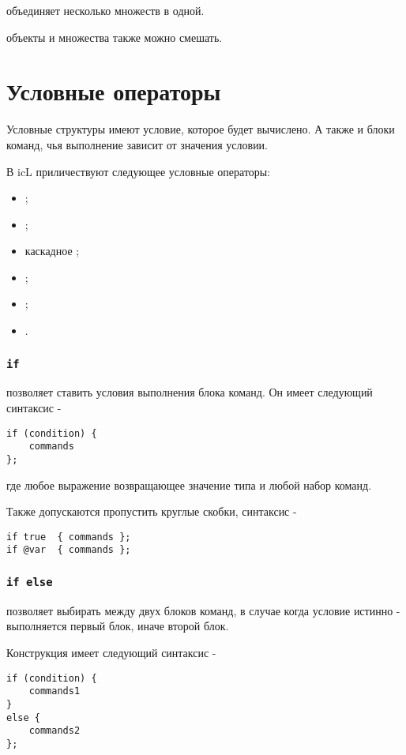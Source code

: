 \documentclass[a4paper, 14pt]{extarticle}
\newenvironment{icItems}
	{ \begin{itemize} [noitemsep,nolistsep] }
	{ \end{itemize} }
\begin{document}
 объединяет несколько множеств в одной.

 объекты и множества также можно смешать.

\newpage
\section{Условные операторы}

Условные структуры имеют условие, которое будет вычислено. А также и блоки команд, чья выполнение зависит от значения условии.

В icL приличествуют следующее условные операторы:
\begin{icItems}
	\item {};
	\item {};
	\item каскадное ;
	\item {};
	\item {};
	\item {}.
\end{icItems}

\subsubsection{\lstinline`if`}

 позволяет ставить условия выполнения блока команд. Он имеет следующий синтаксис -
\begin{lstlisting}[numbers=none]
if (condition) {
	commands
};
\end{lstlisting}
где  любое выражение возвращающее значение типа \bool{} и  любой набор команд.

Также допускаются пропустить круглые скобки, синтаксис -
\begin{lstlisting}[numbers=none]
if true  { commands };
if @var  { commands };
\end{lstlisting}

\subsubsection{\lstinline`if else`}

 позволяет выбирать между двух блоков команд, в случае когда условие истинно - выполняется первый блок, иначе второй блок.

Конструкция  имеет следующий синтаксис -
\begin{lstlisting}[numbers=none]
if (condition) {
	commands1
}
else {
	commands2
};
\end{lstlisting}
\end{document}
